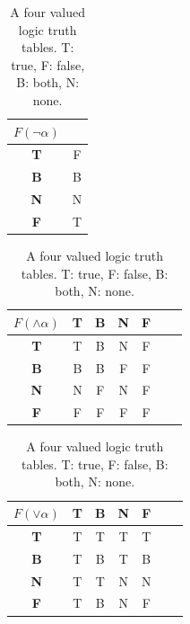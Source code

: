 \documentclass{llncs}
\begin{document}
\begin{table}[H]
    \caption{A four valued logic truth tables. T: true, F: false, B: both, N: none.\label{table:belnap}}
    \begin{minipage}{0.2\textwidth}
        \centering
        \begin{tabular}{|c||c|}\hline
            $F(\neg \alpha)$ & ~ \\ \hline \hline
            \textbf{T}       & F \\ \hline
            \textbf{B}       & B \\ \hline
            \textbf{N}       & N \\ \hline
            \textbf{F}       & T \\ \hline
        \end{tabular}
    \end{minipage}
    \begin{minipage}{0.35\textwidth}
        \centering
        \begin{tabular}{|c||c|c|c|c|c|c|}\hline
            $F(\land \alpha)$ & \textbf{T} & \textbf{B} & \textbf{N} & \textbf{F}  \\ \hline \hline
            \textbf{T}        & T          & B          & N          & F           \\ \hline
            \textbf{B}        & B          & B          & F          & F           \\ \hline
            \textbf{N}        & N          & F          & N          & F           \\ \hline
            \textbf{F}        & F          & F          & F          & F           \\ \hline
        \end{tabular}
    \end{minipage}
    \begin{minipage}{0.35\textwidth}
        \centering
        \begin{tabular}{|c||c|c|c|c|c|c|}\hline
            $F(\lor \alpha)$  & \textbf{T} & \textbf{B} & \textbf{N} & \textbf{F}  \\ \hline \hline
            \textbf{T}        & T          & T          & T          & T           \\ \hline
            \textbf{B}        & T          & B          & T          & B           \\ \hline
            \textbf{N}        & T          & T          & N          & N           \\ \hline
            \textbf{F}        & T          & B          & N          & F           \\ \hline
        \end{tabular}
    \end{minipage}
\end{table}
\end{document}
